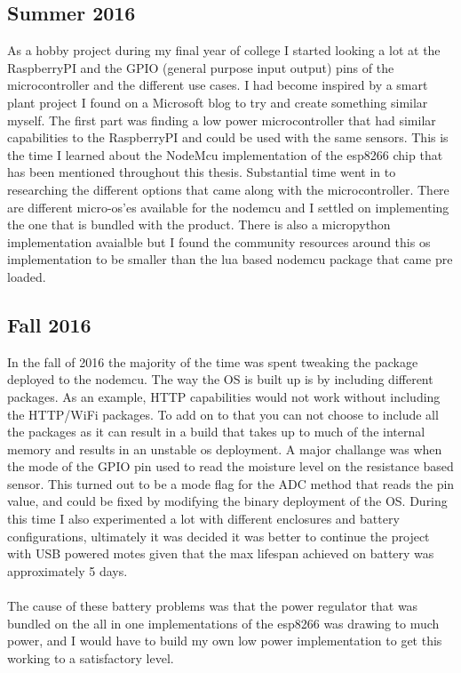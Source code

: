 \documentclass[]{uiophd}
\begin{document}
\subsection{Summer 2016}
As a hobby project during my final year of college I started looking a lot at the RaspberryPI and the GPIO (general purpose input output) pins of the microcontroller and the different use cases. I had become inspired by a smart plant project I found on a Microsoft blog to try and create something similar myself. The first part was finding a low power microcontroller that had similar capabilities to the RaspberryPI and could be used with the same sensors. This is the time I learned about the NodeMcu implementation of the esp8266 chip that has been mentioned throughout this thesis. Substantial time went in to researching the different options that came along with the microcontroller. There are different micro-os'es available for the nodemcu and I settled on implementing the one that is bundled with the product. There is also a micropython implementation avaialble but I found the community resources around this os implementation to be smaller than the lua based nodemcu package that came pre loaded.
\subsection{Fall 2016}
In the fall of 2016 the majority of the time was spent tweaking the package deployed to the nodemcu. The way the OS is built up is by including different packages. As an example, HTTP capabilities would not work without including the HTTP/WiFi packages. To add on to that you can not choose to include all the packages as it can result in a build that takes up to much of the internal memory and results in an unstable os deployment. A major challange was when the mode of the GPIO pin used to read the moisture level on the resistance based sensor. This turned out to be a mode flag for the ADC method that reads the pin value, and could be fixed by modifying the binary deployment of the OS. During this time I also experimented a lot with different enclosures and battery configurations, ultimately it was decided it was better to continue the project with USB powered motes given that the max lifespan achieved on battery was approximately 5 days.
\\\\
The cause of these battery problems was that the power regulator that was bundled on the all in one implementations of the esp8266 was drawing to much power, and I would have to build my own low power implementation to get this working to a satisfactory level.
\end{document}
